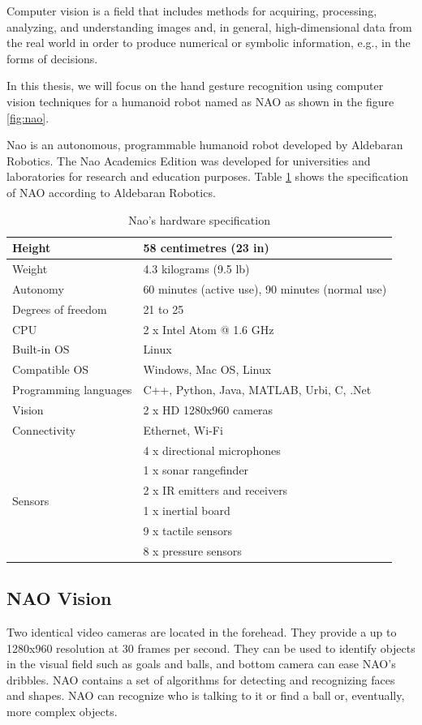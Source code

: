 Computer vision is a field that includes methods for acquiring, processing, analyzing, and understanding images and, in general, high-dimensional data from the real world in order to produce numerical or symbolic information, e.g., in the forms of decisions.

In this thesis, we will focus on the hand gesture recognition using computer vision techniques for a humanoid robot named as NAO as shown in the figure \ref{fig:nao}.

Nao is an autonomous, programmable humanoid robot developed by Aldebaran Robotics. The Nao Academics Edition was developed for universities and laboratories for research and education purposes. Table \ref{tb:nao} shows the specification of NAO according to Aldebaran Robotics.
\begin{table}
	[h] \centering \caption{Nao's hardware specification } \label{tb:nao} 
	\begin{tabular}
		{|l|l|} \hline Height & 58 centimetres (23 in) \\
		\hline Weight & 4.3 kilograms (9.5 lb) \\
		\hline Autonomy & 60 minutes (active use), 90 minutes (normal use) \\
		\hline Degrees of freedom & 21 to 25 \\
		\hline CPU & 2 x Intel Atom @ 1.6 GHz \\
		\hline Built-in OS & Linux \\
		\hline Compatible OS & Windows, Mac OS, Linux \\
		\hline Programming languages & C++, Python, Java, MATLAB, Urbi, C, .Net \\
		\hline Vision & 2 x HD 1280x960 cameras \\
		\hline Connectivity & Ethernet, Wi-Fi \\
		\hline \multirow{6}{*}{Sensors} & 4 x directional microphones \\
		& 1 x sonar rangefinder \\
		& 2 x IR emitters and receivers \\
		& 1 x inertial board \\
		& 9 x tactile sensors \\
		& 8 x pressure sensors \\
		\hline 
	\end{tabular}
\end{table}

\subsection{NAO Vision} Two identical video cameras are located in the forehead. They provide a up to 1280x960 resolution at 30 frames per second. They can be used to identify objects in the visual field such as goals and balls, and bottom camera can ease NAO's dribbles. NAO contains a set of algorithms for detecting and recognizing faces and shapes. NAO can recognize who is talking to it or find a ball or, eventually, more complex objects.

